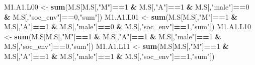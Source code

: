\documentclass[
]{book}
\newenvironment{Shaded}{\begin{snugshade}}{\end{snugshade}}
\newcommand{\DecValTok}[1]{\textcolor[rgb]{0.00,0.00,0.81}{#1}}
\newcommand{\FunctionTok}[1]{\textcolor[rgb]{0.13,0.29,0.53}{\textbf{#1}}}
\newcommand{\NormalTok}[1]{#1}
\newcommand{\OtherTok}[1]{\textcolor[rgb]{0.56,0.35,0.01}{#1}}
\newcommand{\SpecialCharTok}[1]{\textcolor[rgb]{0.81,0.36,0.00}{\textbf{#1}}}
\newcommand{\StringTok}[1]{\textcolor[rgb]{0.31,0.60,0.02}{#1}}
\begin{document}
\begin{Shaded}
\begin{Highlighting}[]
\NormalTok{  M1.A1.L00 }\OtherTok{\textless{}{-}} \FunctionTok{sum}\NormalTok{(M.S[M.S[,}\StringTok{"M"}\NormalTok{]}\SpecialCharTok{==}\DecValTok{1} \SpecialCharTok{\&}\NormalTok{ M.S[,}\StringTok{"A"}\NormalTok{]}\SpecialCharTok{==}\DecValTok{1} \SpecialCharTok{\&}\NormalTok{ M.S[,}\StringTok{"male"}\NormalTok{]}\SpecialCharTok{==}\DecValTok{0} \SpecialCharTok{\&} 
\NormalTok{                         M.S[,}\StringTok{"soc\_env"}\NormalTok{]}\SpecialCharTok{==}\DecValTok{0}\NormalTok{,}\StringTok{"sum"}\NormalTok{])}
\NormalTok{  M1.A1.L01 }\OtherTok{\textless{}{-}} \FunctionTok{sum}\NormalTok{(M.S[M.S[,}\StringTok{"M"}\NormalTok{]}\SpecialCharTok{==}\DecValTok{1} \SpecialCharTok{\&}\NormalTok{ M.S[,}\StringTok{"A"}\NormalTok{]}\SpecialCharTok{==}\DecValTok{1} \SpecialCharTok{\&}\NormalTok{ M.S[,}\StringTok{"male"}\NormalTok{]}\SpecialCharTok{==}\DecValTok{0} \SpecialCharTok{\&} 
\NormalTok{                         M.S[,}\StringTok{"soc\_env"}\NormalTok{]}\SpecialCharTok{==}\DecValTok{1}\NormalTok{,}\StringTok{"sum"}\NormalTok{])}
\NormalTok{  M1.A1.L10 }\OtherTok{\textless{}{-}} \FunctionTok{sum}\NormalTok{(M.S[M.S[,}\StringTok{"M"}\NormalTok{]}\SpecialCharTok{==}\DecValTok{1} \SpecialCharTok{\&}\NormalTok{ M.S[,}\StringTok{"A"}\NormalTok{]}\SpecialCharTok{==}\DecValTok{1} \SpecialCharTok{\&}\NormalTok{ M.S[,}\StringTok{"male"}\NormalTok{]}\SpecialCharTok{==}\DecValTok{1} \SpecialCharTok{\&} 
\NormalTok{                         M.S[,}\StringTok{"soc\_env"}\NormalTok{]}\SpecialCharTok{==}\DecValTok{0}\NormalTok{,}\StringTok{"sum"}\NormalTok{])}
\NormalTok{  M1.A1.L11 }\OtherTok{\textless{}{-}} \FunctionTok{sum}\NormalTok{(M.S[M.S[,}\StringTok{"M"}\NormalTok{]}\SpecialCharTok{==}\DecValTok{1} \SpecialCharTok{\&}\NormalTok{ M.S[,}\StringTok{"A"}\NormalTok{]}\SpecialCharTok{==}\DecValTok{1} \SpecialCharTok{\&}\NormalTok{ M.S[,}\StringTok{"male"}\NormalTok{]}\SpecialCharTok{==}\DecValTok{1} \SpecialCharTok{\&} 
\NormalTok{                         M.S[,}\StringTok{"soc\_env"}\NormalTok{]}\SpecialCharTok{==}\DecValTok{1}\NormalTok{,}\StringTok{"sum"}\NormalTok{])}
  

\end{Highlighting}
\end{Shaded}
\end{document}
